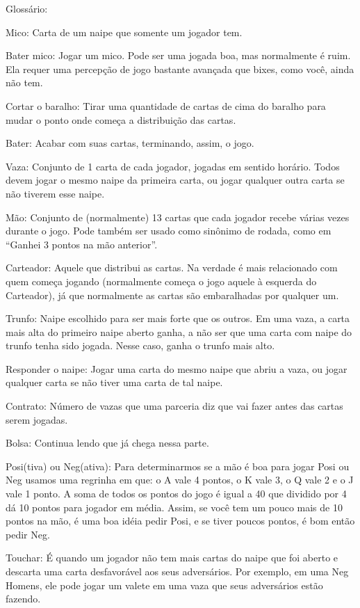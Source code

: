 \begin{subsecao}{Glossário:}

Mico: Carta de um naipe que somente um jogador tem.

Bater mico: Jogar um mico. Pode ser uma jogada boa, mas normalmente é
ruim. Ela requer uma percepção de jogo bastante avançada que bixes,
como você, ainda não tem.

Cortar o baralho: Tirar uma quantidade de cartas de cima do baralho para mudar
o ponto onde começa a distribuição das cartas.

Bater: Acabar com suas cartas, terminando, assim, o jogo.

Vaza: Conjunto de 1 carta de cada jogador, jogadas em sentido horário. Todos
devem jogar o mesmo naipe da primeira carta, ou jogar qualquer outra carta se
não tiverem esse naipe.

Mão: Conjunto de (normalmente) 13 cartas que cada jogador recebe várias vezes
durante o jogo. Pode também ser usado como sinônimo de rodada, como
em ``Ganhei 3 pontos na mão anterior''.

Carteador: Aquele que distribui as cartas. Na verdade é mais relacionado com
quem começa jogando (normalmente começa o jogo aquele à esquerda do Carteador),
já que normalmente as cartas são embaralhadas por qualquer um.

Trunfo: Naipe escolhido para ser mais forte que os outros. Em uma vaza, a carta
mais alta do primeiro naipe aberto ganha, a não ser que uma carta com naipe do
trunfo tenha sido jogada. Nesse caso, ganha o trunfo mais alto.

Responder o naipe: Jogar uma carta do mesmo naipe que abriu a vaza, ou jogar
qualquer carta se não tiver uma carta de tal naipe.

Contrato: Número de vazas que uma parceria diz que vai fazer antes das cartas
serem jogadas.

Bolsa: Continua lendo que já chega nessa parte.

Posi(tiva) ou Neg(ativa): Para determinarmos se a mão é boa para jogar Posi ou
Neg usamos uma regrinha em que: o A vale 4 pontos, o K vale 3, o Q vale 2 e o J
vale 1 ponto. A soma de todos os pontos do jogo é igual a 40 que dividido por 4
dá 10 pontos para jogador em média. Assim, se você tem um pouco mais de 10
pontos na mão, é uma boa idéia pedir Posi, e se tiver poucos pontos, é bom
então pedir Neg.

Touchar: É quando um jogador não tem mais cartas do naipe que foi aberto e
descarta uma carta desfavorável aos seus adversários. Por exemplo, em uma Neg
Homens, ele pode jogar um valete em uma vaza que seus adversários estão fazendo.


\end{subsecao}
